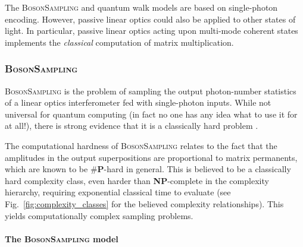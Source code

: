 The \textsc{BosonSampling} and quantum walk models are based on single-photon encoding. However, passive linear optics could also be applied to other states of light. In particular, passive linear optics acting upon multi-mode coherent states implements the \textit{classical} computation of matrix multiplication.

%
%

\subsubsection{\textsc{BosonSampling}} \label{sec:BS} 

\textsc{BosonSampling} is the problem of sampling the output photon-number statistics of a linear optics interferometer fed with single-photon inputs. While not universal for quantum computing (in fact no one has any idea what to use it for at all!), there is strong evidence that it is a classically hard problem \cite{bib:AaronsonArkhipov10, bib:RohdeIntroBS15}.

The computational hardness of \textsc{BosonSampling} relates to the fact that the amplitudes in the output superpositions are proportional to matrix permanents, which are known to be \#\textbf{P}-hard in general. This is believed to be a classically hard complexity class, even harder than \textbf{NP}-complete in the complexity hierarchy, requiring exponential classical time to evaluate (see Fig.~\ref{fig:complexity_classes} for the believed complexity relationships). This yields computationally complex sampling problems.

%
%

\paragraph{The \textsc{BosonSampling} model} 

